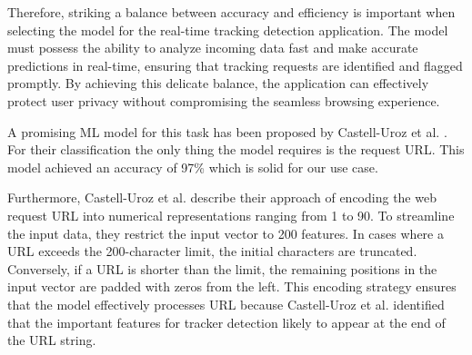 Therefore, striking a balance between accuracy and efficiency is important when selecting the model for the real-time
tracking detection application. The model must possess the ability to analyze incoming data fast and make accurate predictions
in real-time, ensuring that tracking requests are identified and flagged promptly. By achieving this delicate balance, the application
can effectively protect user privacy without compromising the seamless browsing experience.

A promising ML model for this task has been proposed by Castell-Uroz et al. \cite{castell2020url}. For their classification the only thing
the model requires is the request URL. This model achieved an accuracy of 97\% which is solid for our use case.

Furthermore, Castell-Uroz et al. describe their approach of encoding the web request URL into numerical
representations ranging from 1 to 90. To streamline the input data, they restrict the input vector to 200 features.
In cases where a URL exceeds the 200-character limit, the initial characters are truncated. Conversely, if a URL
is shorter than the limit, the remaining positions in the input vector are padded with zeros from the left.
This encoding strategy ensures that the model effectively processes URL because Castell-Uroz et al. identified that the important
features for tracker detection likely to appear at the end of the URL string.
